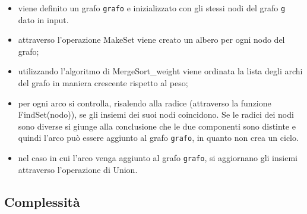\begin{itemize}
    \item viene definito un grafo \texttt{grafo} e inizializzato con gli stessi nodi del grafo \texttt{g} dato in input.
    \item attraverso l'operazione MakeSet viene creato un albero per ogni nodo del grafo;
    \item utilizzando l'algoritmo di MergeSort\_weight viene ordinata la lista degli archi del grafo in maniera crescente rispetto al peso;
    \item per ogni arco si controlla, risalendo alla radice (attraverso la funzione FindSet(nodo)), se gli insiemi dei suoi nodi coincidono. Se le radici dei nodi sono diverse si giunge alla conclusione che le due componenti sono distinte e quindi l'arco può essere aggiunto al grafo \texttt{grafo}, in quanto non crea un ciclo. 
    \item nel caso in cui l'arco venga aggiunto al grafo \texttt{grafo}, si aggiornano gli insiemi attraverso l'operazione di Union.
\end{itemize}


\subsection{Complessità}
\label{complessità}